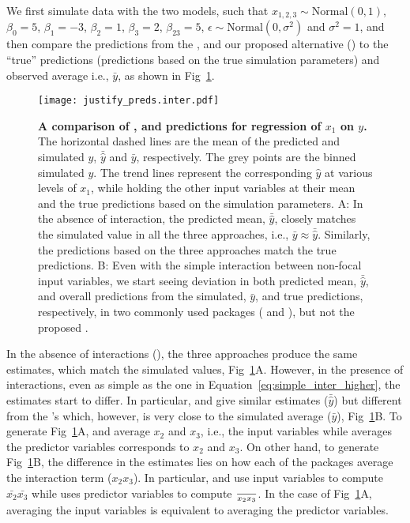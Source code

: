 We first simulate data with the two models, such that $x_{1,2,3} \sim \mathrm{Normal}(0, 1)$, $\beta_0 = 5$, $\beta_1 = -3$, $\beta_2 = 1$, $\beta_3 = 2$, $\beta_{23} = 5$, $\epsilon \sim \mathrm{Normal}(0, \sigma^2)$ and $\sigma^2 = 1$, and then compare the predictions from the ,  and our proposed alternative () to the ``true'' predictions (predictions based on the true simulation parameters) and observed average i.e., $\bar{y}$, as shown in Fig~\ref{fig:justify_plots}.
%
\begin{figure}
\begin{center}
\texttt{[image: justify\_preds.inter.pdf]}
\end{center}
\caption{{\bf A comparison of ,  and  predictions for regression of $x_1$ on $y$.} The horizontal dashed lines are the mean of the predicted and simulated $y$, $\bar{\hat{y}}$ and $\bar{y}$, respectively. The grey points are the binned simulated $y$. The trend lines represent the corresponding $\hat{y}$ at various levels of $x_1$, while holding the other input variables at their mean and the true predictions based on the simulation parameters. A: In the absence of interaction, the predicted mean, $\bar{\hat{y}}$, closely matches the simulated value in all the three approaches, i.e., $\bar{y} \approx \bar{\hat{y}}$. Similarly, the predictions based on the three approaches match the true predictions. B: Even with the simple interaction between non-focal input variables, we start seeing deviation in both predicted mean, $\bar{\hat{y}}$, and overall predictions from the simulated, $\bar{y}$, and true predictions, respectively, in two commonly used packages ( and ), but not the proposed .}
\label{fig:justify_plots}
\end{figure}
%
In the absence of interactions (), the three approaches produce the same estimates, which match the simulated values, Fig~\ref{fig:justify_plots}A. However, in the presence of interactions, even as simple as the one in Equation~\ref{eq:simple_inter_higher}, the estimates start to differ. In particular,  and  give similar estimates ($\bar{\hat{y}}$) but different from the 's which, however, is very close to the simulated average ($\bar{y}$), Fig~\ref{fig:justify_plots}B. To generate Fig~\ref{fig:justify_plots}A,   and  average $x_2$ and $x_3$, i.e., the input variables while  averages the predictor variables corresponds to $x_2$ and $x_3$. On other hand, to generate Fig~\ref{fig:justify_plots}B, the difference in the estimates lies on how each of the packages average the interaction term ($x_2x_3$). In particular,  and  use input variables to compute $\bar{x_2}\bar{x_3}$ while  uses predictor variables to compute $\over{x_2x_3}$. In the case of Fig~\ref{fig:justify_plots}A, averaging the input variables is equivalent to averaging the predictor variables.

